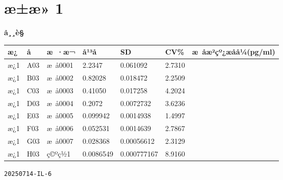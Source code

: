 \documentclass[UTF8,10pt,a4paper,fontset=fandol]{ctexart}
\begin{document}
\section*{æ±æ» 1}
\textbf{å¸¸è§}

\begin{center}
\small
\begin{tabular}{lllllll}
æ¿ & å­ & æ ·æ¬ & å¹³å & SD & CV\% & æ åæ²çº¿æåå¼(pg/ml)\\ \hline
æ¿1 & A03 & æ å0001 & 2.2347 & 0.061092 & 2.7310 & \\
æ¿1 & B03 & æ å0002 & 0.82028 & 0.018472 & 2.2509 & \\
æ¿1 & C03 & æ å0003 & 0.41050 & 0.017258 & 4.2024 & \\
æ¿1 & D03 & æ å0004 & 0.2072 & 0.0072732 & 3.6236 & \\
æ¿1 & E03 & æ å0005 & 0.099942 & 0.0014938 & 1.4997 & \\
æ¿1 & F03 & æ å0006 & 0.052531 & 0.0014639 & 2.7867 & \\
æ¿1 & G03 & æ å0007 & 0.028368 & 0.00056612 & 2.3129 & \\
æ¿1 & H03 & ç©ºç½1 & 0.0086549 & 0.000777167 & 8.9160 &
\end{tabular}
\end{center}


\newpage

\noindent\texttt{20250714-IL-6}

\end{document}
